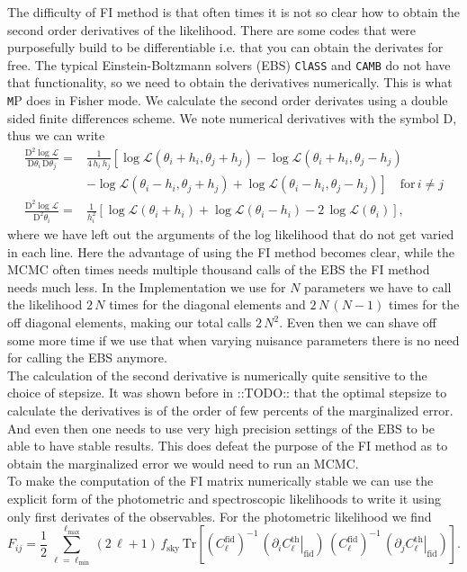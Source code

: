 \documentclass[oneside]{book}
\newcommand*{\rD}{\mathrm{D}}
\newcommand*{\marktodo}{{\color{mmcol} ::TODO::}\xspace}
\newcommand*{\montepython}{\texttt MP\xspace}
\begin{document}
The difficulty of FI method is that often times it is not so clear how to obtain the second order derivatives of the likelihood. There are some codes that were purposefully build to be differentiable i.e. that you can obtain the derivates for free. The typical Einstein-Boltzmann solvers (EBS) {\tt ClASS} and {\tt CAMB} do not have that functionality, so we need to obtain the derivatives numerically. This is what \montepython does in Fisher mode. We calculate the second order derivates using a double sided finite differences scheme. We note numerical derivatives with the symbol D, thus we can write 
\begin{align}
    \frac{\rD^2 \log\mathcal{L}}{\rD \theta_i \, \rD \theta_j} =& \frac{1}{4\,h_i\,h_j}\left[\log\mathcal{L}(\theta_i+h_i,\theta_j+h_j)-\log\mathcal{L}(\theta_i+h_i,\theta_j-h_j)\right. \nonumber\\
&-\left.\log\mathcal{L}(\theta_i-h_i,\theta_j+h_j)+\log\mathcal{L}(\theta_i-h_i,\theta_j-h_j)\right]\quad \text{for}\,i\neq j\\
    \frac{\rD^2 \log\mathcal{L}}{\rD^2 \theta_i} =&  \frac{1}{h_i^2} \left[\log\mathcal{L}(\theta_i+h_i)+\log\mathcal{L}(\theta_i-h_i)-2\,\log\mathcal{L}(\theta_i)\right],
\end{align}
where we have left out the arguments of the log likelihood that do not get varied in each line. Here the advantage of using the FI method becomes clear, while the MCMC often times needs multiple thousand calls of the EBS the FI method needs much less. In the Implementation we use for $N$ parameters we have to call the likelihood $2\,N$ times for the diagonal elements and $2\,N\,(N-1)$ times for the off diagonal elements, making our total calls $2\,N^2$. Even then we can shave off some more time if we use that when varying nuisance parameters there is no need for calling the EBS anymore.\\
The calculation of the second derivative is numerically quite sensitive to the choice of stepsize. It was shown before in \marktodo that the optimal stepsize to calculate the derivatives is of the order of few percents of the marginalized error. And even then one needs to use very high precision settings of the EBS to be able to have stable results. This does defeat the purpose of the FI method as to obtain the marginalized error we would need to run an MCMC.\\
To make the computation of the FI matrix numerically stable we can use the explicit form of the photometric and spectroscopic likelihoods to write it using only first derivates of the observables. For the photometric likelihood we find \begin{equation}
    F_{ij} = \frac{1}{2}\,\sum_{\ell=\ell_\mathrm{min}}^{\ell_\mathrm{max}} (2\,\ell+1)\,f_\mathrm{sky}\,\mathrm{Tr}\left[\left(C_\ell^\mathrm{fid}\right)^{-1}\,\left(\left.\partial_i C^\mathrm{th}_\ell\right|_\mathrm{fid}\right)\,\left(C_\ell^\mathrm{fid}\right)^{-1}\,\left(\left.\partial_j C^\mathrm{th}_\ell\right|_\mathrm{fid}\right)\right].
\end{equation}
\end{document}
